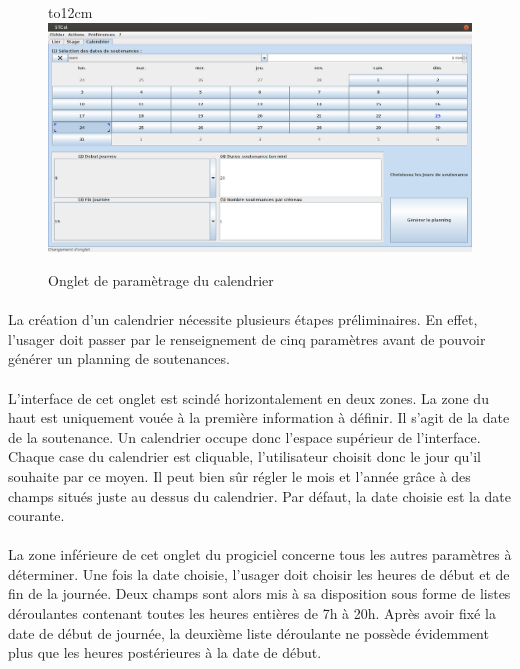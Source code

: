 \documentclass[a4paper,10pt]{report}
\begin{document}
		\begin{figure}[!h]
		\hbox to12cm{\hss\includegraphics[width=16cm]{Calendrier.png}\hss}
		\caption{Onglet de paramètrage du calendrier}
		\end{figure}
		
	      \paragraph{}  
		La création d'un calendrier nécessite plusieurs étapes préliminaires.
		En effet, l'usager doit passer par le renseignement de cinq paramètres avant de pouvoir générer un planning de soutenances.
		
	      \paragraph{}
		L'interface de cet onglet est scindé horizontalement en deux zones.
		La zone du haut est uniquement vouée à la première information à définir.
		Il s'agit de la date de la soutenance.
		Un calendrier occupe donc l'espace supérieur de l'interface.
		Chaque case du calendrier est cliquable, l'utilisateur choisit donc le jour qu'il souhaite par ce moyen.
		Il peut bien sûr régler le mois et l'année grâce à des champs situés juste au dessus du calendrier.
		Par défaut, la date choisie est la date courante.
		
	      \paragraph{}
		La zone inférieure de cet onglet du progiciel concerne tous les autres paramètres à déterminer.
		Une fois la date choisie, l'usager doit choisir les heures de début et de fin de la journée.
		Deux champs sont alors mis à sa disposition sous forme de listes déroulantes contenant toutes les heures entières de 7h à 20h.
		Après avoir fixé la date de début de journée, la deuxième liste déroulante ne possède évidemment plus que les heures postérieures à la date de début.
		
\end{document}
